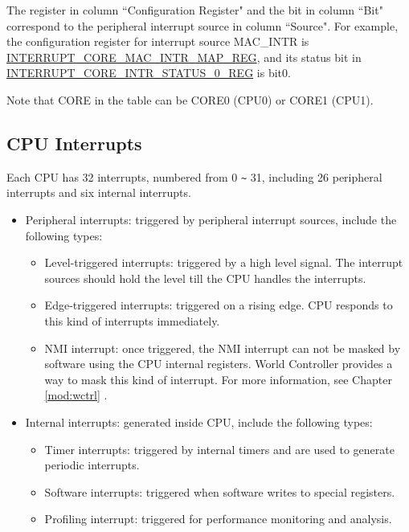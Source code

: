 \documentclass[main\_\_EN.tex]{subfiles}
\begin{document}
The register in column ``Configuration Register" and the bit in column ``Bit" correspond to the peripheral interrupt source in column ``Source". For example, the configuration register for interrupt source MAC\_INTR is \hyperref[regdesc:INTERRUPTCORE0MACINTRMAPREG]{INTERRUPT\_CORE\_MAC\_INTR\_MAP\_REG}, and its status bit in \hyperref[regdesc:INTERRUPTCORE0INTRSTATUS0REG]{INTERRUPT\_CORE\_INTR\_STATUS\_0\_REG} is bit0.

Note that CORE in the table can be CORE0 (CPU0) or CORE1 (CPU1).
\clearpage
\begin{landscape}

\end{landscape}
\restoregeometry
\clearpage

\subsection{CPU Interrupts}

Each CPU has 32 interrupts, numbered from 0 \verb+~+ 31, including 26 peripheral interrupts and six internal interrupts.
\begin{itemize}
    \item Peripheral interrupts: triggered by peripheral interrupt sources, include the following types:
    \begin{itemize}
        \item Level-triggered interrupts: triggered by a high level signal. The interrupt sources should hold the level till the CPU handles the interrupts.
        \item Edge-triggered interrupts: triggered on a rising edge. CPU responds to this kind of interrupts immediately.
        \item NMI interrupt: once triggered, the NMI interrupt can not be masked by software using the CPU internal registers. World Controller provides a way to mask this kind of interrupt. For more information, see Chapter \ref{mod:wctrl} \textit{}.
    \end{itemize}
    \item Internal interrupts: generated inside CPU, include the following types:
    \begin{itemize}
       \item Timer interrupts: triggered by internal timers and are used to generate periodic interrupts.
        \item Software interrupts: triggered when software writes to special registers.
        \item Profiling interrupt: triggered for performance monitoring and analysis.
    \end{itemize}
\end{itemize}
\end{document}
